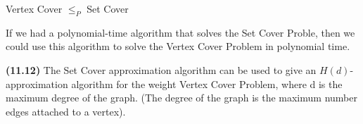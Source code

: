 \documentclass{proc}
\begin{document}
\begin{mdframed}
    Vertex Cover $\le_{P}$ Set Cover
\end{mdframed}

If we had a polynomial-time algorithm that solves the Set Cover Proble, then we could use this algorithm to solve the Vertex Cover Problem in polynomial time.

\begin{mdframed}
    \textbf{(11.12)} The Set Cover approximation algorithm can be used to give an $H(d)$-approximation algorithm for the weight Vertex Cover Problem, where d is the maximum degree of the graph. (The degree of the graph is the maximum number edges attached to a vertex).
\end{mdframed}
\end{document}
